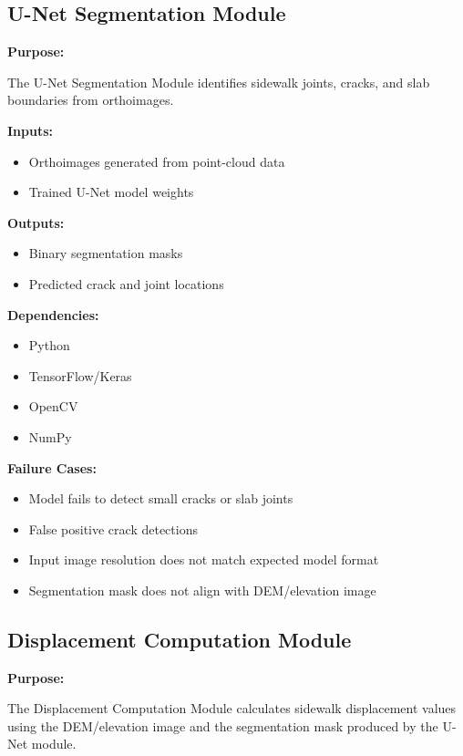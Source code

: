 \documentclass{article}
\begin{document}
\subsection{U-Net Segmentation Module}

\textbf{Purpose:}

The U-Net Segmentation Module identifies sidewalk joints, cracks, and slab boundaries from orthoimages.

\textbf{Inputs:}

\begin{itemize}
    \item Orthoimages generated from point-cloud data
    \item Trained U-Net model weights
\end{itemize}

\textbf{Outputs:}

\begin{itemize}
    \item Binary segmentation masks
    \item Predicted crack and joint locations
\end{itemize}

\textbf{Dependencies:}

\begin{itemize}
    \item Python
    \item TensorFlow/Keras
    \item OpenCV
    \item NumPy
\end{itemize}

\textbf{Failure Cases:}

\begin{itemize}
    \item Model fails to detect small cracks or slab joints
    \item False positive crack detections
    \item Input image resolution does not match expected model format
    \item Segmentation mask does not align with DEM/elevation image
\end{itemize}

\subsection{Displacement Computation Module}

\textbf{Purpose:}

The Displacement Computation Module calculates sidewalk displacement values using the DEM/elevation image and the segmentation mask produced by the U-Net module.
\end{document}
